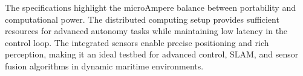 \noindent
The specifications highlight the microAmpere balance between portability and computational power. The distributed computing setup provides sufficient resources for advanced autonomy tasks while maintaining low latency in the control loop. The integrated sensors enable precise positioning and rich perception, making it an ideal testbed for advanced control, SLAM, and sensor fusion algorithms in dynamic maritime environments.
